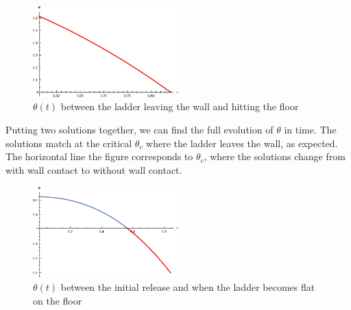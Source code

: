 \documentclass{article}
\theoremstyle{definition}
\begin{document}
\begin{enumerate}[label = (\alph*)]
		\begin{figure}[!htb]
			\centering
			\includegraphics[width=0.5\textwidth]{theta_non_contact.eps}
			\caption{$\theta(t)$ between the ladder leaving the wall and hitting the floor}
		\end{figure}
		Putting two solutions together, we can find the full evolution of $\theta$ in time. The solutions match at the critical $\theta_c$ where the ladder leaves the wall, as expected. The horizontal line the figure corresponds to $\theta_c$, where the solutions change from with wall contact to without wall contact. 
		\begin{figure}[!htb]
			\centering
			\includegraphics[width=0.5\textwidth]{theta_full.eps}
			\caption{$\theta(t)$ between the initial release and when the ladder becomes flat on the floor}
		\end{figure}
	
	
		
		
		
	\end{enumerate} 
	
	
	
\end{document}

